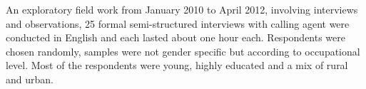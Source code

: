 An exploratory field work  from January 2010 to April 2012, involving interviews and observations, 25 formal semi-structured interviews with calling agent were conducted in English and each lasted about one hour each. Respondents were chosen randomly, samples were not gender specific but according to occupational level. Most of the respondents were young, highly educated and a mix of rural and urban.